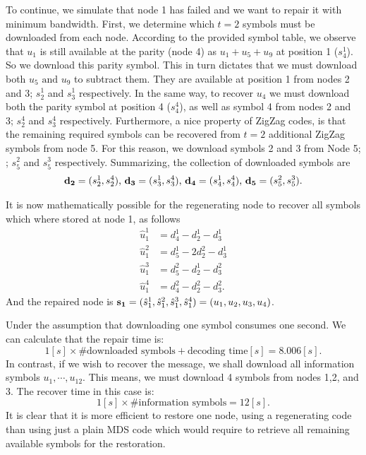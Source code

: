 \documentclass{article}
\begin{document}
To continue, we simulate that node 1 has failed and we want to repair it with minimum bandwidth. First, we determine which $t=2$ symbols must be downloaded from each node. According to the provided symbol table, we observe that $u_1$ is still available at the parity (node 4) as $u_1+u_5+u_9$ at position 1 ($s_4^1$). So we download this parity symbol. This in turn dictates that we must download both $u_5 \text{ and } u_9$ to subtract them. They are available at position 1 from nodes 2  and 3; $s_2^1$ and $s_3^1$ respectively. In the same way, to recover $u_4$ we must download both the parity symbol at position 4 ($s_4^4$), as well as symbol 4 from nodes 2 and 3; $s_2^4$ and $s_3^4$ respectively. Furthermore, a nice property of ZigZag codes, is that the remaining required symbols can be recovered from $t=2$ additional ZigZag symbols from node 5. For this reason, we download symbols 2 and 3 from Node 5; ; $s_5^2$ and $s_5^3$ respectively. Summarizing, the collection of downloaded symbols are
\begin{align*}
\vb{d_2} = (s_2^1, s_2^4) \text{, }
\vb{d_3} = (s_3^1, s_3^4) \text{, }
\vb{d_4} = (s_4^1, s_4^4) \text{, }
\vb{d_5} = (s_5^2, s_5^3).
\end{align*}

It is now mathematically possible for the regenerating node to recover all symbols which where stored at node 1, as follows
\begin{align*}
\hat{u}_1^1 &= d_4^1 - d_2^1 - d_3^1 \\
\hat{u}_1^2 &= d_5^1 - 2d_2^2 - d_3^1 \\
\hat{u}_1^3 &= d_5^2 - d_2^1 - d_3^2 \\
\hat{u}_1^4 &= d_4^2 - d_2^2 - d_3^2.
\end{align*}
And the repaired node is $\vb{s_1}= (\hat{s}_1^1,\hat{s}_1^2,\hat{s}_1^3, \hat{s}_1^4) = (u_1, u_2, u_3, u_4)$.

Under the assumption that downloading one symbol consumes one second. We can calculate that the repair time is:
\begin{equation*}
1[s] \times \text{\#downloaded symbols} + \text{decoding time}[s] = 8.006[s].
\end{equation*} 
In contrast, if we wish to recover the message, we shall download all information symbols $u_1,\cdots,u_{12}$. This means, we must download 4 symbols from nodes 1,2, and 3. The recover time in this case is:
\begin{equation*}
1[s] \times \text{\#information symbols} = 12 [s].
\end{equation*} 
It is clear that it is more efficient to restore one node, using a regenerating code than using just a plain MDS code which would require to retrieve all remaining available symbols for the restoration.
\end{document}
